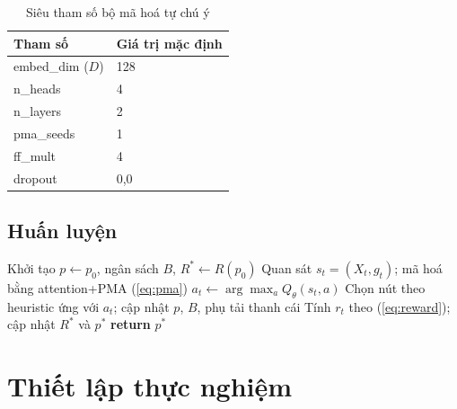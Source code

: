 \documentclass[10pt, conference, a4paper, compsocconf]{IEEEtran}
\begin{document}
\begin{table}[!t]
\caption{Siêu tham số bộ mã hoá tự chú ý}
\label{tab:hparams}
\centering\footnotesize
\begin{tabular}{ll}
\toprule
Tham số & Giá trị mặc định \\
\midrule
embed\_dim ($D$) & 128 \\
n\_heads & 4 \\
n\_layers & 2 \\
pma\_seeds & 1 \\
ff\_mult & 4 \\
dropout & 0,0 \\
\bottomrule
\end{tabular}
\end{table}

\subsection{Huấn luyện}

\begin{algorithm}
\caption{Một episode mở rộng kế hoạch trạm sạc}
\label{alg:rollout}
\begin{algorithmic}[1]
\STATE Khởi tạo $p \leftarrow p_0$, ngân sách $B$, $R^{*} \leftarrow R(p_0)$
  \STATE Quan sát $s_t=(X_t,g_t)$; mã hoá bằng attention+PMA (\ref{eq:pma})
  \STATE $a_t \leftarrow \arg\max_a Q_\theta(s_t,a)$ 
  \STATE Chọn nút theo heuristic ứng với $a_t$; cập nhật $p$, $B$, phụ tải thanh cái
  \STATE Tính $r_t$ theo (\ref{eq:reward}); cập nhật $R^{*}$ và $p^{*}$
\ENDWHILE
\STATE \textbf{return} $p^{*}$
\end{algorithmic}
\end{algorithm}

\section{Thiết lập thực nghiệm}
\end{document}
